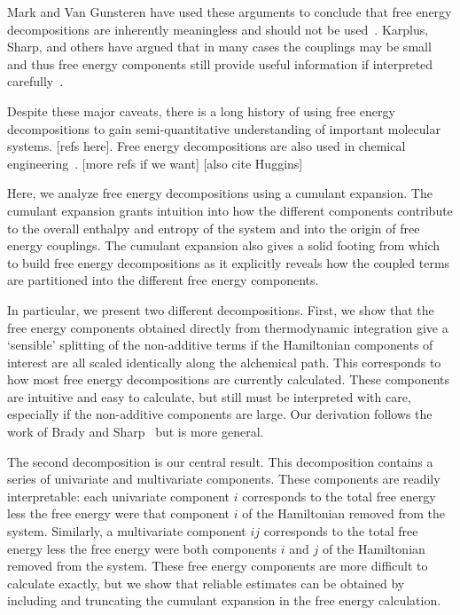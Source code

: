\documentclass{article}
\begin{document}
Mark and Van Gunsteren have used these arguments to conclude that free energy decompositions are inherently meaningless and should not be used~\cite{Smith:1994tn,Mark:1994un}. Karplus, Sharp, and others have argued that in many cases the couplings may be small and thus free energy components still provide useful information if interpreted carefully~\cite{Boresch:1994jj,Brady:1995dz,Boresch:1995ux,Archontis:1996ef}. 

Despite these major caveats, there is a long history of using free energy decompositions to gain semi-quantitative understanding of important molecular systems. [refs here]. Free energy decompositions are also used in chemical engineering~\cite{Dixit:2011cl,Gu:2017ec}. [more refs if we want] [also cite Huggins]

Here, we analyze free energy decompositions using a cumulant expansion. The cumulant expansion grants intuition into how the different components contribute to the overall enthalpy and entropy of the system and into the origin of free energy couplings. The cumulant expansion also gives a solid footing from which to build free energy decompositions as it explicitly reveals how the coupled terms are partitioned into the different free energy components. 

In particular, we present two different decompositions. First, we show that the free energy components obtained directly from thermodynamic integration give a `sensible' splitting of the non-additive terms if the Hamiltonian components of interest are all scaled identically along the alchemical path. This corresponds to how most free energy decompositions are currently calculated. These components are intuitive and easy to calculate, but still must be interpreted with care, especially if the non-additive components are large.  Our derivation follows the work of Brady and Sharp~\cite{Brady:1996gm} but is more general. 

The second decomposition is our central result. This decomposition contains a series of univariate and multivariate components. These components are readily interpretable: each univariate component $i$ corresponds to the total free energy less the free energy were that component $i$ of the Hamiltonian removed from the system. Similarly, a multivariate component $ij $ corresponds to the total free energy less the free energy were both components $i$ and $j$ of the Hamiltonian removed from the system. These free energy components are more difficult to calculate exactly, but we show that reliable estimates can be obtained by including and truncating the cumulant expansion in the free energy calculation. 
\end{document}
